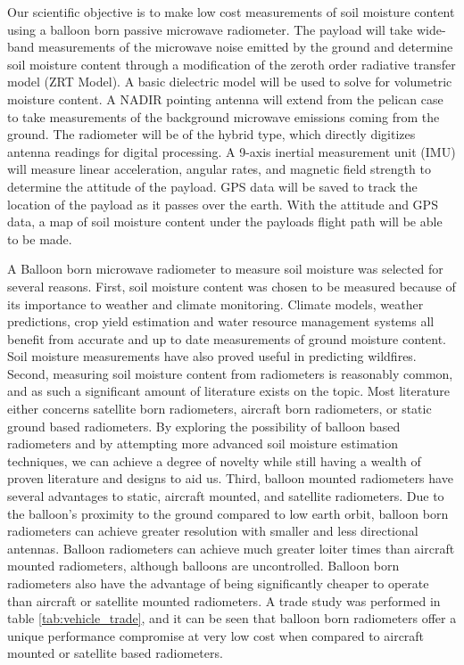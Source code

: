 \documentclass[12pt]{article}
\begin{document}
Our scientific objective is to make low cost measurements of soil moisture content using a balloon born passive microwave radiometer. The payload will take wide-band measurements of the microwave noise emitted by the ground and determine soil moisture content through a modification of the zeroth order radiative transfer model (ZRT Model). A basic dielectric model will be used to solve for volumetric moisture content. \cite{ulaby_fung_moore_1986} A NADIR pointing antenna will extend from the pelican case to take measurements of the background microwave emissions coming from the ground. The radiometer will be of the hybrid type, which directly digitizes antenna readings for digital processing. A 9-axis inertial measurement unit (IMU) will measure linear acceleration, angular rates, and magnetic field strength to determine the attitude of the payload. GPS data will be saved to track the location of the payload as it passes over the earth. With the attitude and GPS data, a map of soil moisture content under the payloads flight path will be able to be made. 

A Balloon born microwave radiometer to measure soil moisture was selected for several reasons. First, soil moisture content was chosen to be measured because of its importance to weather and climate monitoring.\cite{Pan2001} Climate models, weather predictions, crop yield estimation and water resource management systems all benefit from accurate and up to date measurements of ground moisture content. Soil moisture measurements have also proved useful in predicting wildfires.\cite{chaparro_piles_vall-llossera_2016,krueger_ochsner_quiring_engle_carlson_twidwell_fuhlendorf_2017} Second, measuring soil moisture content from radiometers is reasonably common, and as such a significant amount of literature exists on the topic. Most literature either concerns satellite born radiometers, aircraft born radiometers, or static ground based radiometers. \cite{Hanington,Kerr2001,ulaby_fung_moore_1986,Friesen2008,Schmugge1994} By exploring the possibility of balloon based radiometers and by attempting more advanced soil moisture estimation techniques, we can achieve a degree of novelty while still having a wealth of proven literature and designs to aid us. Third, balloon mounted radiometers have several advantages to static, aircraft mounted, and satellite radiometers. Due to the balloon's proximity to the ground compared to low earth orbit, balloon born radiometers can achieve greater resolution with smaller and less directional antennas. Balloon radiometers can achieve much greater loiter times than aircraft mounted radiometers, although balloons are uncontrolled. Balloon born radiometers also have the advantage of being significantly cheaper to operate than aircraft or satellite mounted radiometers. A trade study was performed in table \ref{tab:vehicle_trade}, and it can be seen that balloon born radiometers offer a unique performance compromise at very low cost when compared to aircraft mounted or satellite based radiometers.
\end{document}
